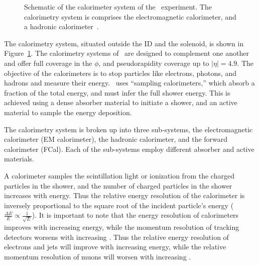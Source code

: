 \begin{figure}[ht]
  \caption[
    Schematic of the calorimeter system of the
    \atlas\ experiment~\cite{cern-jinst-atlas}.
  ]{
    Schematic of the calorimeter system of the
    \atlas\ experiment.
    The calorimetry system is comprises the electromagnetic calorimeter,
    and a hadronic calorimeter~\cite{cern-jinst-atlas}.
  }
  \label{fig:calo_cartoon}
\end{figure}

The calorimetry system, situated outside the ID and the solenoid, is shown
in Figure~\ref{fig:calo_cartoon}.
The calorimetry systems of \atlas\ are designed to complement one another and
offer full coverage in the $\phi$, and pseudorapidity coverage up to
$|\eta| = 4.9$.
The objective of the calorimeters is to stop particles like electrons, photons,
and hadrons and measure their energy.
\atlas\ uses ``sampling calorimeters,'' which absorb a fraction of the total
energy, and must infer the full shower energy.
This is achieved using a dense absorber material to initiate a shower, and
an active material to sample the energy deposition.

The calorimetry system is broken up into three sub-systems, the electromagnetic
calorimeter (EM calorimeter), the hadronic calorimeter, and the forward
calorimeter (FCal).
Each of the sub-systems employ different absorber and active materials.

A calorimeter samples the scintillation light or ionization from the charged
particles in the shower, and the number of charged particles in the shower
increases with energy.
Thus the relative energy resolution of the calorimeter is inversely proportional
to the square root of the incident particle's energy
($\frac{\Delta E}{E} \propto \frac{1}{\sqrt{E}}$).
It is important to note that the energy resolution of calorimeters improves
with increasing energy, while the momentum resolution of tracking detectors
worsens with increasing \pt.
Thus the relative energy resolution of electrons and jets will improve with
increasing energy, while the relative momentum resolution of muons will worsen
with increasing \pt.

